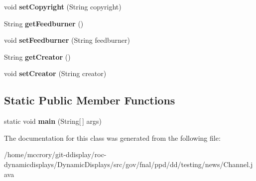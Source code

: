\begin{DoxyCompactItemize}
\item 
\hypertarget{classgov_1_1fnal_1_1ppd_1_1dd_1_1testing_1_1news_1_1Channel_a32ca1c6ea6201a2b6e9836d37177cc02}{void {\bfseries set\-Copyright} (String copyright)}\label{classgov_1_1fnal_1_1ppd_1_1dd_1_1testing_1_1news_1_1Channel_a32ca1c6ea6201a2b6e9836d37177cc02}

\item 
\hypertarget{classgov_1_1fnal_1_1ppd_1_1dd_1_1testing_1_1news_1_1Channel_a925192c7e75ada168b17ac0c734c3049}{String {\bfseries get\-Feedburner} ()}\label{classgov_1_1fnal_1_1ppd_1_1dd_1_1testing_1_1news_1_1Channel_a925192c7e75ada168b17ac0c734c3049}

\item 
\hypertarget{classgov_1_1fnal_1_1ppd_1_1dd_1_1testing_1_1news_1_1Channel_adc8c876fbb40c13e30307637953eb990}{void {\bfseries set\-Feedburner} (String feedburner)}\label{classgov_1_1fnal_1_1ppd_1_1dd_1_1testing_1_1news_1_1Channel_adc8c876fbb40c13e30307637953eb990}

\item 
\hypertarget{classgov_1_1fnal_1_1ppd_1_1dd_1_1testing_1_1news_1_1Channel_abb1072e32bd4245967215cd9087ce0b8}{String {\bfseries get\-Creator} ()}\label{classgov_1_1fnal_1_1ppd_1_1dd_1_1testing_1_1news_1_1Channel_abb1072e32bd4245967215cd9087ce0b8}

\item 
\hypertarget{classgov_1_1fnal_1_1ppd_1_1dd_1_1testing_1_1news_1_1Channel_ac056142fcb57127d39d3bef0f69c9057}{void {\bfseries set\-Creator} (String creator)}\label{classgov_1_1fnal_1_1ppd_1_1dd_1_1testing_1_1news_1_1Channel_ac056142fcb57127d39d3bef0f69c9057}

\end{DoxyCompactItemize}
\subsection*{Static Public Member Functions}
\begin{DoxyCompactItemize}
\item 
\hypertarget{classgov_1_1fnal_1_1ppd_1_1dd_1_1testing_1_1news_1_1Channel_a7eb29c0a564b013df0643f3c82041c50}{static void {\bfseries main} (String\mbox{[}$\,$\mbox{]} args)}\label{classgov_1_1fnal_1_1ppd_1_1dd_1_1testing_1_1news_1_1Channel_a7eb29c0a564b013df0643f3c82041c50}

\end{DoxyCompactItemize}


The documentation for this class was generated from the following file\-:\begin{DoxyCompactItemize}
\item 
/home/mccrory/git-\/ddisplay/roc-\/dynamicdisplays/\-Dynamic\-Displays/src/gov/fnal/ppd/dd/testing/news/Channel.\-java\end{DoxyCompactItemize}
